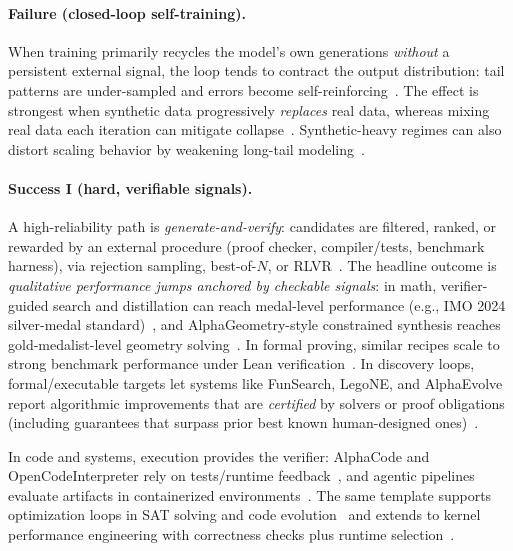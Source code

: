 \documentclass{article}
\theoremstyle{plain}
\theoremstyle{definition}
\theoremstyle{remark}
\begin{document}
\paragraph{Failure (closed-loop self-training).}
When training primarily recycles the model's own generations \textit{without} a persistent external signal, the loop tends to contract the output distribution: tail patterns are under-sampled and errors become self-reinforcing~\cite{shumailovAIModelsCollapse2024,alemohammadSelfConsumingGenerativeModels2024}. The effect is strongest when synthetic data progressively \textit{replaces} real data, whereas mixing real data each iteration can mitigate collapse~\cite{gerstgrasserModelCollapseInevitable2024}. Synthetic-heavy regimes can also distort scaling behavior by weakening long-tail modeling~\cite{dohmatobTaleTailsModel2024}.

\paragraph{Success I (hard, verifiable signals).}
A high-reliability path is \textit{generate-and-verify}: candidates are filtered, ranked, or rewarded by an external procedure (proof checker, compiler/tests, benchmark harness), via rejection sampling, best-of-$N$, or RLVR~\cite{guoDeepSeekR1IncentivizesReasoning2025,duoJudgeRLVRJudgeFirst2026}. The headline outcome is \emph{qualitative performance jumps anchored by checkable signals}: in math, verifier-guided search and distillation can reach medal-level performance (e.g., IMO 2024 silver-medal standard)~\cite{hubertOlympiadlevelFormalMathematical2025,alphaproofAIAchievesSilvermedal2024}, and AlphaGeometry-style constrained synthesis reaches gold-medalist-level geometry solving~\cite{trinhSolvingOlympiadGeometry2024,chervonyiGoldmedalistPerformanceSolving2025}. In formal proving, similar recipes scale to strong benchmark performance under Lean verification~\cite{renDeepSeekProverV2AdvancingFormal2025,chenSeedProverDeepBroad2025,chenSeedProver15Mastering2025}. In discovery loops, formal/executable targets let systems like FunSearch, LegoNE, and AlphaEvolve report algorithmic improvements that are \emph{certified} by solvers or proof obligations (including guarantees that surpass prior best known human-designed ones)~\cite{romera-paredesMathematicalDiscoveriesProgram2024,liDiscoveringExpertLevelNash2025,novikovAlphaEvolveCodingAgent2025}.

In code and systems, execution provides the verifier: AlphaCode and OpenCodeInterpreter rely on tests/runtime feedback~\cite{liCompetitionlevelCodeGeneration2022,zhengOpenCodeInterpreterIntegratingCode2024}, and agentic pipelines evaluate artifacts in containerized environments~\cite{deepseek-aiDeepSeekV32PushingFrontier2025,xiaomillm-coreteamMiMoV2FlashTechnicalReport2026}. The same template supports optimization loops in SAT solving and code evolution~\cite{sunAutoSATAutomaticallyOptimize2024,sunAutomaticallyDiscoveringHeuristics2025} and extends to kernel performance engineering with correctness checks plus runtime selection~\cite{chenAutomatingGPUKernel2025,ouyangKernelBenchCanLLMs2025}.
\end{document}
